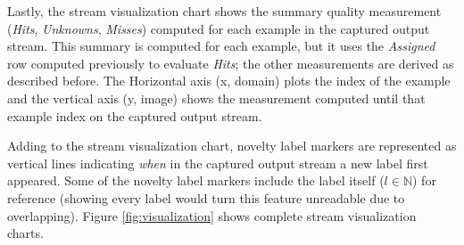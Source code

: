 Lastly, the stream visualization chart shows the summary quality measurement
(\emph{Hits}, \emph{Unknowns}, \emph{Misses})
computed for each example in the captured output stream.
This summary is computed for each example, but it uses the \emph{Assigned} row
computed previously to evaluate \emph{Hits}; the other measurements are derived as
described before.
The Horizontal axis (x, domain) plots the index of the example and the
vertical axis (y, image) shows the measurement computed until that example index on the captured
output stream.

Adding to the stream visualization chart, novelty label markers are represented
as vertical lines indicating \emph{when} in the captured output stream a new
label first appeared.
Some of the novelty label markers include the label itself ($l \in \mathbb{N}$)
for reference (showing every label would turn this feature unreadable due
to overlapping).
Figure \ref{fig:visualization} shows complete stream visualization charts.


